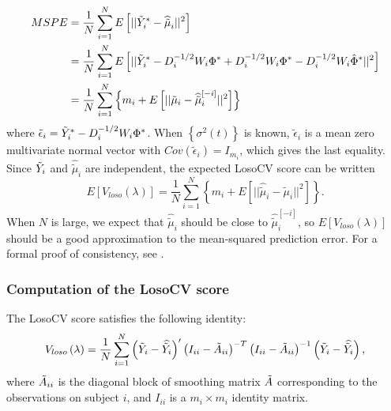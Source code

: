 \begin{align}
\begin{split}\label{eq:MSPE}
MSPE &= \frac{1}{N}\sum_{i=1}^N E\left[ \vert \vert \tilde{Y}^*_i - \widehat{\tilde{\mu}}_{i} \vert \vert^2 \right]\\
&=  \frac{1}{N}\sum_{i=1}^N E\left[ \vert \vert \tilde{Y}^*_i - D_i^{-1/2}W_i \Phi^* + D_i^{-1/2}W_i \Phi^* - D_i^{-1/2}W_i \hat{\Phi}^*\vert \vert^2 \right]\\
&=  \frac{1}{N}\sum_{i=1}^N \left\{m_i + E\left[ \vert \vert \tilde{\mu}_{i} - \widehat{\tilde{\mu}}^{\left[ -i \right]}_{i} \vert \vert^2 \right] \right\}
\end{split}
\end{align}
\noindent
where $\tilde{\epsilon}_i = \tilde{Y}^*_i - D_i^{-1/2}W_i \Phi^*$. When $\left\{ \sigma^2\left(t\right)\right\}$ is known, $\tilde{\epsilon}_i$ is a mean zero multivariate normal vector with $Cov\left(\tilde{\epsilon}_i\right) = I_{m_i}$, which gives the last equality. Since $\tilde{Y}_i$ and $ \widehat{\tilde{\mu}}_{i} $ are independent, the expected LosoCV score can be written
\begin{equation} \label{eq:MSPE_LOSOCV}
E\left[V_{loso}\left(\lambda\right) \right] =  \frac{1}{N}\sum_{i=1}^N\left\{ m_i +  E\left[ \vert \vert \widehat{\tilde{\mu}}_{i} - \tilde{\mu}_{i} \vert \vert^2 \right] \right\}. 
\end{equation}
\noindent
When $N$ is large, we expect that $\widehat{\tilde{\mu}}_{i}$ should be close to $\widehat{\tilde{\mu}}^{\left[ -i \right]}_{i}$, so $E\left[V_{loso}\left(\lambda\right) \right]$ should be a good approximation to the mean-squared prediction error. For a formal proof of consistency, see \citet{xu2012asymptotic}.

  \subsubsection{Computation of the LosoCV score}
  
  \begin{lemma} \label{lemma:losocv-shortcut}
  The LosoCV score satisfies the following identity:
  \begin{equation*}
 V_{loso}\left( \lambda \right) = \frac{1}{N} \sum_{i = 1}^N \left(\tilde{Y}_i - \widehat{\tilde{Y}_i}\right)' \left(I_{ii} - \tilde{A}_{ii}\right)^{-T}\left(I_{ii} - \tilde{A}_{ii}\right)^{-1}\left(\tilde{Y}_i - \widehat{\tilde{Y}_i}\right),
  \end{equation*}
  \noindent
  where $\tilde{A}_{ii}$ is the diagonal block of smoothing matrix $\tilde{A}$ corresponding to the observations on subject $i$, and $I_{ii}$ is a $m_i \times m_i$ identity matrix.
\end{lemma}

